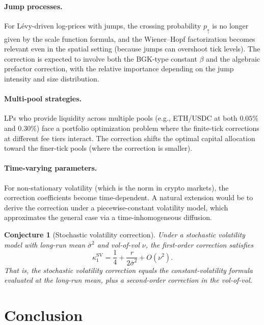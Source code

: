 \documentclass[11pt]{article}
\newtheorem{conjecture}[theorem]{Conjecture}
\theoremstyle{definition}
\theoremstyle{remark}
\begin{document}
\paragraph{Jump processes.}
For L\'evy-driven log-prices with jumps, the crossing probability
$p_\uparrow$ is no longer given by the scale function formula, and
the Wiener--Hopf factorization becomes relevant even in the spatial
setting (because jumps can overshoot tick levels). The correction is
expected to involve both the BGK-type constant $\beta$ and the
algebraic prefactor correction, with the relative importance depending
on the jump intensity and size distribution.

\paragraph{Multi-pool strategies.}
LPs who provide liquidity across multiple pools (e.g., ETH/USDC at
both $0.05\%$ and $0.30\%$) face a portfolio optimization problem
where the finite-tick corrections at different fee tiers interact.
The correction shifts the optimal capital allocation toward the
finer-tick pools (where the correction is smaller).

\paragraph{Time-varying parameters.}
For non-stationary volatility (which is the norm in crypto markets),
the correction coefficients become time-dependent. A natural extension
would be to derive the correction under a piecewise-constant
volatility model, which approximates the general case via a
time-inhomogeneous diffusion.

\begin{conjecture}[Stochastic volatility correction]
\label{conj:sv}
Under a stochastic volatility model with long-run mean
$\bar{\sigma}^2$ and vol-of-vol $\nu$, the first-order correction
satisfies
\[
\kappa_1^{\mathrm{SV}} = \frac{1}{4}
+ \frac{r}{2\bar{\sigma}^2} + O(\nu^2).
\]
That is, the stochastic volatility correction equals the
constant-volatility formula evaluated at the long-run mean, plus a
second-order correction in the vol-of-vol.
\end{conjecture}

\section{Conclusion}\label{sec:conclusion}
\end{document}
